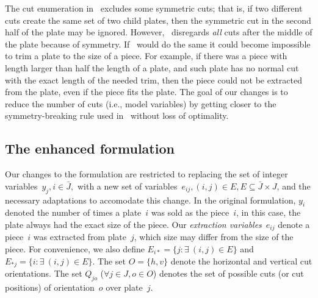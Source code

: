 \documentclass[smallextended]{svjour3}       %
\begin{document}

The cut enumeration in~\cite{furini:2016} excludes some symmetric cuts; that is, if two different cuts create the same set of two child plates, then the symmetric cut in the second half of the plate may be ignored.
However,~\cite{nicos:1977} disregards \emph{all} cuts after the middle of the plate because of symmetry.
If~\cite{furini:2016} would do the same it could become impossible to trim a plate to the size of a piece.
For example, if there was a piece with length larger than half the length of a plate, and such plate has no normal cut with the exact length of the needed trim, then the piece could not be extracted from the plate, even if the piece fits the plate.
The goal of our changes is to reduce the number of cuts (i.e., model variables) by getting closer to the symmetry-breaking rule used in~\cite{nicos:1977} without loss of optimality.


\subsection{The enhanced formulation}
\label{sec:enhanced}

Our changes to the formulation are restricted to replacing the set of integer variables~\(y_j, i \in \bar{J},\) with a new set of variables~\(e_{ij}, (i, j) \in E, E \subseteq \bar{J} \times J\), and the necessary adaptations to accomodate this change.
In the original formulation, \(y_i\) denoted the number of times a plate~\(i\) was sold as the piece~\(i\), in this case, the plate always had the exact size of the piece.
Our \emph{extraction variables}~\(e_{ij}\) denote a piece~\(i\) was extracted from plate~\(j\), which size may differ from the size of the piece.
For convenience, we also define \(E_{i*} = \{ j : \exists~(i, j) \in E \}\) and \(E_{*j} = \{i : \exists~(i, j) \in E \}\).
The set \(O = \{h, v\}\) denote the horizontal and vertical cut orientations.
The set \(Q_{jo}\) (\(\forall j \in J, o \in O\)) denotes the set of possible cuts (or cut positions) of orientation~\(o\) over plate~\(j\).
\end{document}
